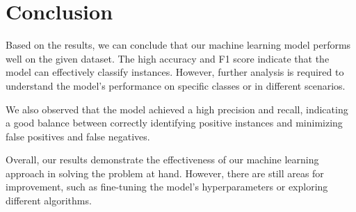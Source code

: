 \section{Conclusion}

Based on the results, we can conclude that our machine learning model performs well on the given dataset. The high accuracy and F1 score indicate that the model can effectively classify instances. However, further analysis is required to understand the model's performance on specific classes or in different scenarios.

We also observed that the model achieved a high precision and recall, indicating a good balance between correctly identifying positive instances and minimizing false positives and false negatives.

Overall, our results demonstrate the effectiveness of our machine learning approach in solving the problem at hand. However, there are still areas for improvement, such as fine-tuning the model's hyperparameters or exploring different algorithms.



